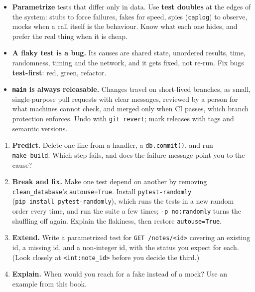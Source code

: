 \begin{takeaways}
\begin{itemize}
\item
  \textbf{Parametrize} tests that differ only in data. Use \textbf{test doubles} at the edges of the system: stubs to force failures, fakes for speed, spies (\texttt{caplog}) to observe, mocks when a call itself is the behaviour. Know what each one hides, and prefer the real thing when it is cheap.
\item
  \textbf{A flaky test is a bug.} Its causes are shared state, unordered results, time, randomness, timing and the network, and it gets fixed, not re-run. Fix bugs \textbf{test-first}: red, green, refactor.
\item
  \textbf{\texttt{main} is always releasable.} Changes travel on short-lived branches, as small, single-purpose pull requests with clear messages, reviewed by a person for what machines cannot check, and merged only when CI passes, which branch protection enforces. Undo with \texttt{git\ revert}; mark releases with tags and semantic versions.
\end{itemize}

\end{takeaways}

\label{17-build-process:exercises}

\begin{enumerate}
\def\labelenumi{\arabic{enumi}.}
\tightlist
\item
  \textbf{Predict.} Delete one line from a handler, a \texttt{db.commit()}, and run \texttt{make\ build}. Which step fails, and does the failure message point you to the cause?
\item
  \textbf{Break and fix.} Make one test depend on another by removing \texttt{clean\_database}'s \texttt{autouse=True}. Install \texttt{pytest-randomly} (\texttt{pip\ install\ pytest-}\allowbreak{}\texttt{randomly}), which runs the tests in a new random order every time, and run the suite a few times; \texttt{-p\ no:randomly} turns the shuffling off again. Explain the flakiness, then restore \texttt{autouse=True}.
\item
  \textbf{Extend.} Write a parametrized test for \texttt{GET\ /notes/\textless{}id\textgreater{}} covering an existing id, a missing id, and a non-integer id, with the status you expect for each. (Look closely at \texttt{\textless{}int:note\_id\textgreater{}} before you decide the third.)
\item
  \textbf{Explain.} When would you reach for a fake instead of a mock? Use an example from this book.
\end{enumerate}

